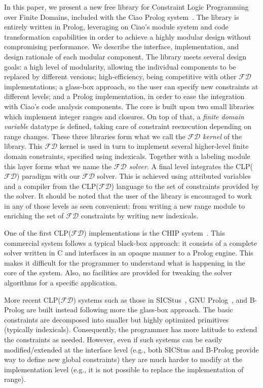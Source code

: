 \documentclass{llncs}
\newcommand{\clpfd}{CLP($\mathcal{FD}$)\xspace}
\newcommand{\fd}{$\mathcal{FD}$\xspace}
\begin{document}
In this paper, we present a new free library for Constraint Logic
Programming over Finite Domains, included with the Ciao Prolog
system~\cite{hermenegildo11:ciao-design-tplp}.
The library is entirely written in Prolog, leveraging on Ciao's
  module system and code transformation capabilities in order to
  achieve a highly modular design without compromising performance.
  We describe the interface, implementation, and design rationale of
  each modular component.
The library meets several design goals: a high level of modularity,
  allowing the individual components to be replaced by different
  versions; high-efficiency, being competitive with other \fd
  implementations; a glass-box approach, so the user can specify new
  constraints at different levels; and a Prolog implementation, in order
  to ease the integration with Ciao's code analysis components.
The core is built upon two small libraries which implement integer
  ranges and closures. On top of that, a \emph{finite domain variable}
  datatype is defined, taking care of constraint reexecution depending
  on range changes. These three libraries form what we call the
  \emph{\fd kernel} of the library.
This \fd kernel is used in turn to implement several higher-level
  finite domain constraints, specified using indexicals. Together with
  a labeling module this layer forms what we name the \emph{\fd
    solver}.
A final level integrates the \clpfd paradigm with
  our \fd solver. This is achieved using attributed variables and a
  compiler from the \clpfd language to the set of constraints
  provided by the solver.
It should be noted that the user of the library is encouraged to
  work in any of those levels as seen convenient: from writing a
  new range module to enriching the set of \fd constraints by writing
  new indexicals.

\medskip

One of the first \clpfd implementations is the CHIP
system~\cite{chip}.  This commercial system follows a typical
black-box approach: it consists of a complete solver written in C and
interfaces in an opaque manner to a Prolog engine. This makes it
difficult for the programmer to understand what is happening in the
core of the system. Also, no facilities are provided for tweaking the
solver algorithms for a specific application.

More recent \clpfd systems such as those in
SICStus~\cite{Carlsson:1997:OFD:646452.692956}, GNU
Prolog~\cite{diaz11:gnu_prolog,clpfd}, and B-Prolog
\cite{Zhou:2006:PFC:1180162.1180163} are built instead following more
the glass-box approach. The basic constraints are decomposed into
smaller but highly optimized primitives (typically indexicals).
Consequently, the programmer has more latitude to extend the
constraints as needed. However, even if such systems can be easily
modified/extended at the interface level (e.g., both SICStus and
B-Prolog provide way to define new global constraints) they are much
harder to modify at the implementation level (e.g., it is not possible
to replace the implementation of range).
\end{document}
